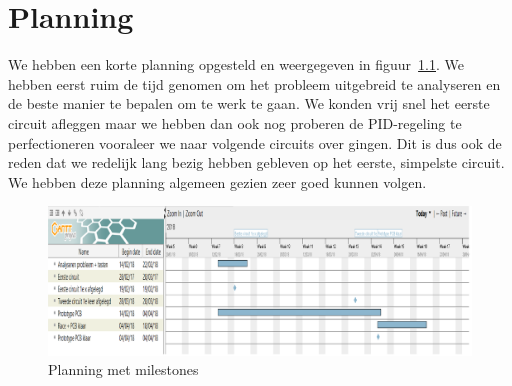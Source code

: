 \chapter{Planning}
We hebben een korte planning opgesteld en weergegeven in figuur~\ref{fig:planning}. We hebben eerst ruim de tijd genomen om het probleem uitgebreid te analyseren en de beste manier te bepalen om te werk te gaan. We konden vrij snel het eerste circuit afleggen maar we hebben dan ook nog proberen de PID-regeling te perfectioneren vooraleer we naar volgende circuits over gingen. Dit is dus ook de reden dat we redelijk lang bezig hebben gebleven op het eerste, simpelste circuit. We hebben deze planning algemeen gezien zeer goed kunnen volgen.
\begin{figure}[h]
\centering
\includegraphics[width=1\textwidth]{planning.png}
\caption{Planning met milestones}
\label{fig:planning}
\end{figure}
